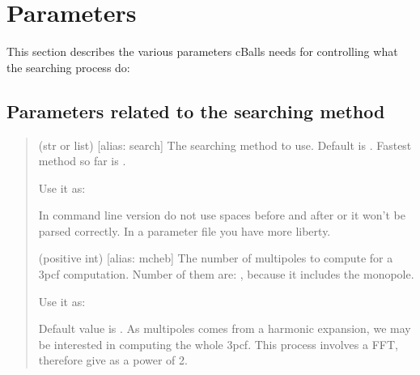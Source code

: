 \documentclass[letterpaper,10pt,english]{sphinxmanual}
\begin{document}
\chapter{Parameters}
\label{\detokenize{params:parameters}}\label{\detokenize{params::doc}}
\sphinxAtStartPar
This section describes the various parameters cBalls needs for controlling
what the searching process do:


\section{Parameters related to the searching method}
\label{\detokenize{params:parameters-related-to-the-searching-method}}\begin{quote}\begin{description}
\sphinxAtStartPar
(str or list) {[}alias: search{]}
The searching method to use. Default is . Fastest method so far is .

\sphinxAtStartPar
Use it as:

\begin{sphinxVerbatim}[commandchars=\\\{\}]
  
\end{sphinxVerbatim}

\sphinxAtStartPar
In command line version do not use spaces before and after \sphinxcode{\sphinxupquote{=}} or it won’t be parsed correctly. In a parameter file you have more liberty.

\sphinxAtStartPar
(positive int) {[}alias: mcheb{]}
The number of multipoles to compute for a 3pcf computation. Number of them are: , because it includes the monopole.

\sphinxAtStartPar
Use it as:

\begin{sphinxVerbatim}[commandchars=\\\{\}]
  
\end{sphinxVerbatim}

\sphinxAtStartPar
Default value is . As multipoles comes from a harmonic expansion, we may be interested in computing the whole 3pcf. This process involves a FFT, therefore give  as a power of 2.

\end{description}\end{quote}
\end{document}
